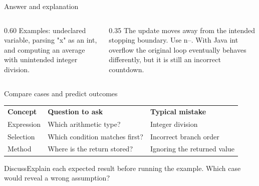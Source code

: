 \documentclass[10pt,aspectratio=169]{beamer}
\begin{document}
\begin{frame}[fragile,t]{Answer and explanation}
\begin{columns}[T,onlytextwidth]\begin{column}{0.60\textwidth}
Examples: undeclared variable, parsing "x" as an int, and computing an average with unintended integer division.
\end{column}\begin{column}{0.35\textwidth}\small
The update moves away from the intended stopping boundary. Use n--. With Java int overflow the original loop eventually behaves differently, but it is still an incorrect countdown.
\end{column}\end{columns}
\end{frame}


\begin{frame}[fragile,t]{Compare cases and predict outcomes}
\small\renewcommand{\arraystretch}{1.5}
\begin{tabularx}{\textwidth}{>{\raggedright\arraybackslash}X>{\raggedright\arraybackslash}X>{\raggedright\arraybackslash}X}\rowcolor{navy}
\color{white}\bfseries Concept & \color{white}\bfseries Question to ask & \color{white}\bfseries Typical mistake\\
Expression & Which arithmetic type? & Integer division\\
Selection & Which condition matches first? & Incorrect branch order\\
Method & Where is the return stored? & Ignoring the returned value\\
\end{tabularx}\par\vspace{3mm}\begin{exampleblock}{Discuss}Explain each expected result before running the example. Which case would reveal a wrong assumption?\end{exampleblock}
\end{frame}
\end{document}
